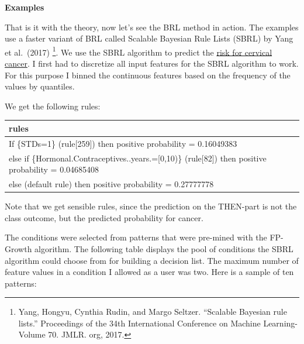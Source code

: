\documentclass[
  11pt,
]{scrbook}
\begin{document}
\textbf{Examples}

That is it with the theory, now let's see the BRL method in action.
The examples use a faster variant of BRL called Scalable Bayesian Rule Lists (SBRL) by Yang et al.~(2017) \footnote{Yang, Hongyu, Cynthia Rudin, and Margo Seltzer. ``Scalable Bayesian rule lists.'' Proceedings of the 34th International Conference on Machine Learning-Volume 70. JMLR. org, 2017.}.
We use the SBRL algorithm to predict the \protect\hyperlink{cervical}{risk for cervical cancer}.
I first had to discretize all input features for the SBRL algorithm to work.
For this purpose I binned the continuous features based on the frequency of the values by quantiles.

We get the following rules:

\begin{table}
\centering
\begin{tabular}{>{\raggedright\arraybackslash}p{10cm}}
\toprule
rules\\
\midrule
If      \{STDs=1\} (rule[259]) then positive probability = 0.16049383\\
else if \{Hormonal.Contraceptives..years.=[0,10)\} (rule[82]) then positive probability = 0.04685408\\
else  (default rule)  then positive probability = 0.27777778\\
\bottomrule
\end{tabular}
\end{table}

Note that we get sensible rules, since the prediction on the THEN-part is not the class outcome, but the predicted probability for cancer.

The conditions were selected from patterns that were pre-mined with the FP-Growth algorithm.
The following table displays the pool of conditions the SBRL algorithm could choose from for building a decision list.
The maximum number of feature values in a condition I allowed as a user was two.
Here is a sample of ten patterns:
\end{document}
